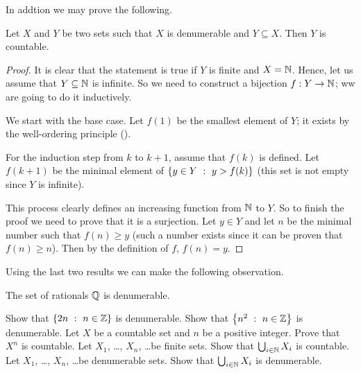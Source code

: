 In addtion we may prove the following.
\begin{theorem}
  Let $X$ and $Y$ be two sets such that $X$ is denumerable and $Y \subseteq X$.
  Then $Y$ is countable.
\end{theorem}
\begin{proof}
  It is clear that the statement is true if $Y$ is finite and $X = {\mathbb{N}}$. 
  Hence, let us assume that $Y \subseteq {\mathbb{N}}$ is infinite. So we need to
  construct a bijection $f : Y \to {\mathbb{N}}$; ww are going to do it inductively.

  We start with the base case.
  Let $f(1)$ be the smallest element of $Y$; it exists by the well-ordering
  principle (). 

  For the induction step from $k$ to $k + 1$, assume that $f(k)$ is defined.
  Let $f(k + 1)$ be the minimal element of $\set[y > f(k)]{y \in Y}$ (this set
  is not empty since $Y$ is infinite).

  This process clearly defines an increasing function from ${\mathbb{N}}$ to $Y$. So to
  finish the proof we need to prove that it is a surjection.
  Let $y \in Y$ and let $n$ be the minimal number such that $f(n) \ge y$ (such a
  number exists since it can be proven that $f(n) \ge n$). Then by the
  definition of $f$, $f(n) = y$.
\end{proof}

Using the last two results we can make the following observation.
\begin{theorem}
  The set of rationals ${\mathbb{Q}}$ is denumerable.
\end{theorem}

\begin{chapterendexercises}
    \exercise[recommended] Show that $\set[n \in \Z]{2n}$ is denumerable.
    \exercise Show that $\set[n \in \Z]{n^2}$ is denumerable.
    \exercise Let $X$ be a countable set and $n$ be a positive integer. Prove
      that $X^n$ is countable.
    \exercise[recommended] Let $X_1$, \dots, $X_n$, \dots be finite sets. Show that
      $\bigcup_{i \in {\mathbb{N}}} X_i$ is countable.
    \exercise Let $X_1$, \dots, $X_n$, \dots be denumerable sets. Show that
      $\bigcup_{i \in {\mathbb{N}}} X_i$ is denumerable.
\end{chapterendexercises}
